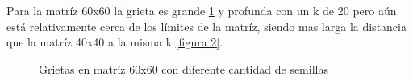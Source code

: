 \documentclass{article}
\begin{document}
Para la matríz 60x60 la grieta es grande \ref{figura 5} y profunda con un k de 20 pero aún está relativamente cerca de los límites de la matríz, siendo mas larga la distancia que la matríz 40x40 a la misma k \ref{figura 2}.

\begin{figure}[htbp]
\centering
{}
\caption{Grietas en matríz 60x60 con diferente cantidad de semillas} \label{figura 5}
\end{figure}
\end{document}
